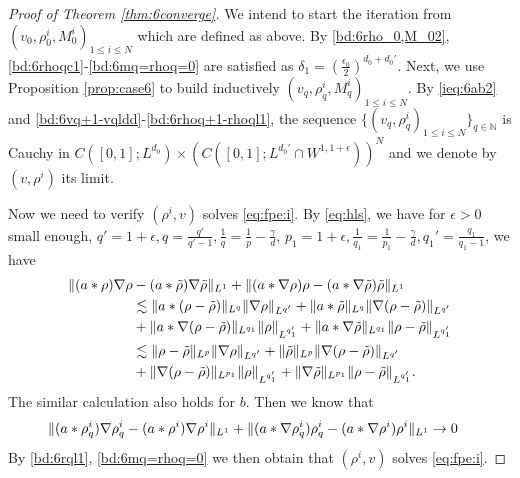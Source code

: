 \documentclass[10pt,a4paper]{amsart}
\numberwithin{equation}{section}
\def\leq{\leqslant}
\def\leq{\leqslant}
\def\N{\mathbb N} \def\kk{\zeta} \def\m{{\bf m}}
\begin{document}
\begin{proof}[Proof of Theorem \ref{thm:6converge}]
We intend to start the iteration from 
$(v_0, \rho^{i}_0,  M^{i}_0)_{1\leq i\leq N}$ which are defined as above. 
By \eqref{bd:6rho_0,M_02},  \eqref{bd:6rhoqc1}-\eqref{bd:6mq=rhoq=0} are satisfied as $\delta_1=(\frac{\epsilon_0}{2})^{d_0+d_0'}$.
Next, we use Proposition \ref{prop:case6} to build inductively $(v_q,\rho^{i}_q, M^{i}_q)_{1\leq i\leq N}$. By \eqref{ieq:6ab2} and \eqref{bd:6vq+1-vqldd}-\eqref{bd:6rhoq+1-rhoql1}, the sequence $\{(v_q,\rho^{i}_q)_{1\leq i\leq N}\}_{q\in \N}$ is
Cauchy in $C([0,1];L^{d_0})  \times (C([0,1];L^{d_0'}\cap W^{1,1+\epsilon}))^{N}$ 
     and we denote by $(v,\rho^{i})$ its limit.

     Now we need to verify $(\rho^{i},v)$  solves   \eqref{eq:fpe:i}.   By \eqref{eq:hls}, we have for  $\epsilon>0$ small enough, $q'=1+\epsilon,q=\frac{q'}{q'-1},\frac1q=\frac1p-\frac\gamma d$, $p_1=1+\epsilon,\frac1{q_1}=\frac1{p_1}-\frac\gamma d,q_1'=\frac{q_1}{q_1-1}$, we have
\begin{align}
     \|(a*\rho)\nabla\rho&-(a*\tilde{\rho})\nabla\tilde{\rho}\|_{L^1}+\|(a*\nabla \rho )\rho -(a*\nabla\tilde{\rho})\tilde{\rho}\|_{L^1}\notag\\
     &\lesssim \|a*(\rho-\tilde{\rho})\|_{L^q}\|\nabla\rho\|_{L^{q'}}+\| a*\tilde{\rho}\|_{L^q}\|\nabla(\rho-\tilde{\rho})\|_{L^{q'}}\notag\\
     &+\|  a*\nabla(\rho-\tilde\rho)\|_{L^{q_1}}\|\rho\|_{L^{q_1'}}+\| a*\nabla\tilde\rho\|_{L^{q_1}}\|\rho-\tilde{\rho}\|_{L^{q_1'}}\notag\\
     &\lesssim \| \rho-\tilde{\rho}\|_{L^p}\|\nabla\rho\|_{L^{q'}}+\| \tilde{\rho}\|_{L^p}\|\nabla(\rho-\tilde{\rho})\|_{L^{q'}}\notag\\
     &+\|  \nabla(\rho-\tilde\rho)\|_{L^{p_1}}\|\rho\|_{L^{q_1'}}+\|  \nabla\tilde\rho\|_{L^{p_1}}\|\rho-\tilde{\rho}\|_{L^{q_1'}}.\label{bd:6arhorho-}
\end{align}
The similar calculation also holds for $b$. Then we know that 
\begin{align}
     \|(a*\rho^i_q)\nabla\rho^i_q&-(a* {\rho^i})\nabla {\rho^i}\|_{L^1}+\|(a*\nabla \rho_q^i )\rho^i_q -(a*\nabla {\rho^i}) {\rho^i}\|_{L^1}\to0\notag
\end{align}
By \eqref{bd:6rql1}, \eqref{bd:6mq=rhoq=0}  we then obtain that $(\rho^{i},v)$  solves   \eqref{eq:fpe:i}. 
    


\end{proof}
\end{document}

